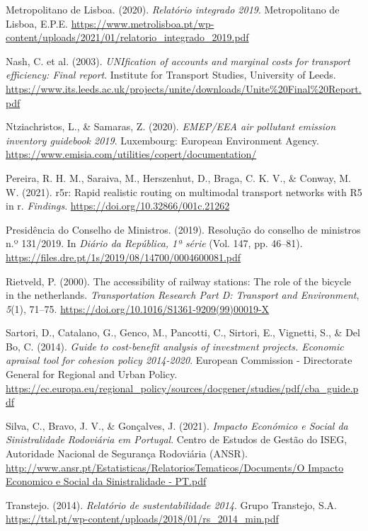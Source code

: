 \documentclass[review, doubleblind, 3p,
authoryear]{elsarticle} %
\newlength{\cslhangindent}
\newlength{\cslentryspacingunit} %
\newenvironment{CSLReferences}[2] %
 {%
  \setlength{\parindent}{0pt}
  \ifodd #1
  \let\oldpar\par
  \def\par{\hangindent=\cslhangindent\oldpar}
  \fi
  \setlength{\parskip}{#2\cslentryspacingunit}
 }%
 {}
\begin{document}
\begin{CSLReferences}{1}{0}
\leavevmode{}%
Metropolitano de Lisboa. (2020). \emph{Relatório integrado 2019}.
{Metropolitano de Lisboa, E.P.E.}
\url{https://www.metrolisboa.pt/wp-content/uploads/2021/01/relatorio_integrado_2019.pdf}

\leavevmode{}%
Nash, C. et al. (2003). \emph{UNIfication of accounts and marginal costs
for transport efficiency: Final report}. {Institute for Transport
Studies, University of Leeds}.
\url{https://www.its.leeds.ac.uk/projects/unite/downloads/Unite\%20Final\%20Report.pdf}

\leavevmode{}%
Ntziachristos, L., \& Samaras, Z. (2020). \emph{{EMEP/EEA} air pollutant
emission inventory guidebook 2019}. Luxembourg: European Environment
Agency. \url{https://www.emisia.com/utilities/copert/documentation/}

\leavevmode{}%
Pereira, R. H. M., Saraiva, M., Herszenhut, D., Braga, C. K. V., \&
Conway, M. W. (2021). r5r: Rapid realistic routing on multimodal
transport networks with R5 in r. \emph{Findings}.
\url{https://doi.org/10.32866/001c.21262}

\leavevmode{}%
Presidência do Conselho de Ministros. (2019). Resolução do conselho de
ministros n.º 131/2019. In \emph{Diário da República, 1ª série} (Vol.
147, pp. 46--81).
\url{https://files.dre.pt/1s/2019/08/14700/0004600081.pdf}

\leavevmode{}%
Rietveld, P. (2000). The accessibility of railway stations: The role of
the bicycle in the netherlands. \emph{Transportation Research Part D:
Transport and Environment}, \emph{5}(1), 71--75.
\url{https://doi.org/10.1016/S1361-9209(99)00019-X}

\leavevmode{}%
Sartori, D., Catalano, G., Genco, M., Pancotti, C., Sirtori, E.,
Vignetti, S., \& Del Bo, C. (2014). \emph{Guide to cost-benefit analysis
of investment projects. Economic apraisal tool for cohesion policy
2014-2020}. {European Commission - Directorate General for Regional and
Urban Policy}.
\url{https://ec.europa.eu/regional_policy/sources/docgener/studies/pdf/cba_guide.pdf}

\leavevmode{}%
Silva, C., Bravo, J. V., \& Gonçalves, J. (2021). \emph{{Impacto
Económico e Social da Sinistralidade Rodoviária em Portugal}}. {Centro
de Estudos de Gestão do ISEG, Autoridade Nacional de Segurança
Rodoviária (ANSR)}.
\href{http://www.ansr.pt/Estatisticas/RelatoriosTematicos/Documents/O\%20Impacto\%20Economico\%20e\%20Social\%20da\%20Sinistralidade\%20-\%20PT.pdf}{http://www.ansr.pt/Estatisticas/RelatoriosTematicos/Documents/O
Impacto Economico e Social da Sinistralidade - PT.pdf}

\leavevmode{}%
Transtejo. (2014). \emph{Relatório de sustentabilidade 2014}. {Grupo
Transtejo, S.A.}
\url{https://ttsl.pt/wp-content/uploads/2018/01/rs_2014_min.pdf}

\end{CSLReferences}
\end{document}
